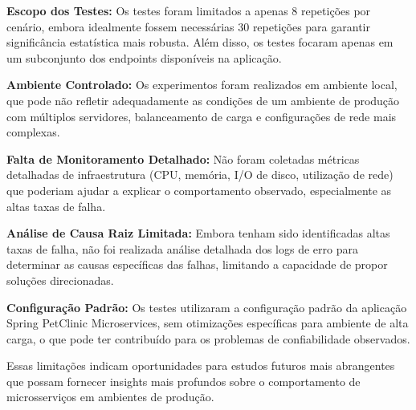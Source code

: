 \documentclass[conference]{IEEEtran}
\begin{document}
    \textbf{Escopo dos Testes:} Os testes foram limitados a apenas 8 repetições por
    cenário, embora idealmente fossem necessárias 30 repetições para garantir
    significância estatística mais robusta. Além disso, os testes focaram apenas
    em um subconjunto dos endpoints disponíveis na aplicação.

    \textbf{Ambiente Controlado:} Os experimentos foram realizados em ambiente local,
    que pode não refletir adequadamente as condições de um ambiente de produção
    com múltiplos servidores, balanceamento de carga e configurações de rede mais
    complexas.

    \textbf{Falta de Monitoramento Detalhado:} Não foram coletadas métricas
    detalhadas de infraestrutura (CPU, memória, I/O de disco, utilização de rede)
    que poderiam ajudar a explicar o comportamento observado, especialmente as
    altas taxas de falha.

    \textbf{Análise de Causa Raiz Limitada:} Embora tenham sido identificadas altas
    taxas de falha, não foi realizada análise detalhada dos logs de erro para
    determinar as causas específicas das falhas, limitando a capacidade de propor
    soluções direcionadas.

    \textbf{Configuração Padrão:} Os testes utilizaram a configuração padrão da
    aplicação Spring PetClinic Microservices, sem otimizações específicas para ambiente
    de alta carga, o que pode ter contribuído para os problemas de
    confiabilidade observados.

    Essas limitações indicam oportunidades para estudos futuros mais abrangentes
    que possam fornecer insights mais profundos sobre o comportamento de
    microsserviços em ambientes de produção.

    

    \vspace{12pt}
\end{document}
